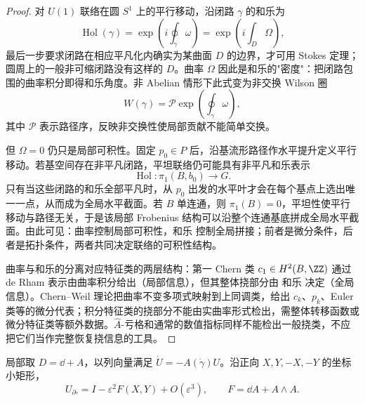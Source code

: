 \begin{proof}
对 $U(1)$ 联络在圆 $S^1$ 上的平行移动，沿闭路 $\gamma$ 的和乐为
\begin{equation*}
\operatorname{Hol}(\gamma)=\exp\left(i\oint_\gamma\omega\right)
=\exp\left(i\int_D\Omega\right),
\end{equation*}
最后一步要求闭路在相应平凡化内确实为某曲面 $D$ 的边界，才可用 Stokes 定理；圆周上的一般非可缩闭路没有这样的 $D$。曲率 $\Omega$ 因此是和乐的"密度"：把闭路包围的曲率积分即得和乐角度。非 Abelian 情形下此式变为非交换 Wilson 圈
\begin{equation*}
W(\gamma)=\mathcal P\exp\left(\oint_\gamma\omega\right),
\end{equation*}
其中 $\mathcal P$ 表示路径序，反映非交换性使局部贡献不能简单交换。

但 $\Omega=0$ 仍只是局部可积性。固定 $p_0\in P$ 后，沿基流形路径作水平提升定义平行移动。若基空间存在非平凡闭路，平坦联络仍可能具有非平凡和乐表示
\[
 \operatorname{Hol}:\pi_1(B,b_0)\to G.
\]
只有当这些闭路的和乐全部平凡时，从 $p_0$ 出发的水平叶才会在每个基点上选出唯一一点，从而成为全局水平截面。若 $B$ 单连通，则 $\pi_1(B)=0$，平坦性使平行移动与路径无关，于是该局部 Frobenius 结构可以沿整个连通基底拼成全局水平截面。由此可见：曲率控制局部可积性，和乐 控制全局拼接；前者是微分条件，后者是拓扑条件，两者共同决定联络的可积性结构。

曲率与和乐的分离对应特征类的两层结构：第一 Chern 类 $c_1\in H^2(B,\ZZ)$ 通过 de Rham 表示由曲率积分给出（局部信息），但其整体挠部分由 和乐 决定（全局信息）。Chern--Weil 理论把曲率不变多项式映射到上同调类，给出 $c_k$、$p_k$、Euler 类等的微分代表；积分特征类的挠部分不能由实曲率形式检出，需整体转移函数或微分特征类等额外数据。$\hat A$-亏格和通常的数值指标同样不能检出一般挠类，不应把它们当作完整恢复挠信息的工具。
\end{proof}

\begin{proposition}[无穷小矩形和乐的曲率系数]
局部取 $D=\dd+A$，以列向量满足 $\dot U=-A(\dot\gamma)U$。沿正向 $X,Y,-X,-Y$ 的坐标小矩形，\[U_{\partial\square}=I-\varepsilon^2F(X,Y)+O(\varepsilon^3),\qquad F=\dd A+A\wedge A.\]
\end{proposition}

